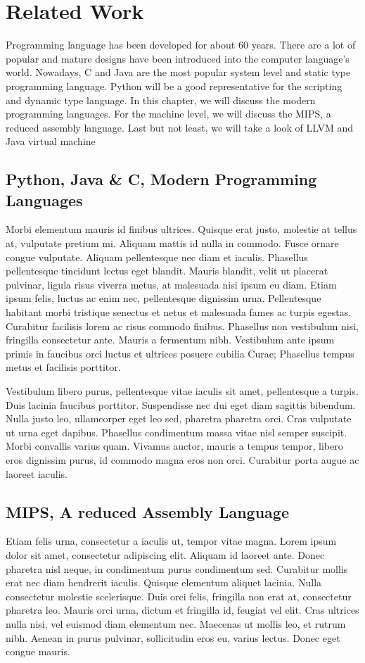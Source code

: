 \chapter{Related Work}
Programming language has been developed for about 60 years. There are a lot of popular and mature designs have been introduced into the computer language's world. Nowadays, C and Java are the most popular system level and static type programming language. Python will be a good representative for the scripting and dynamic type language. In this chapter, we will discuss the modern programming languages. For the machine level, we will discuss the MIPS, a reduced assembly language. Last but not least, we will take a look of LLVM and Java virtual machine

\section{Python, Java \& C, Modern Programming Languages}
Morbi elementum mauris id finibus ultrices. Quisque erat justo, molestie at tellus at, vulputate pretium mi. Aliquam mattis id nulla in commodo. Fusce ornare congue vulputate. Aliquam pellentesque nec diam et iaculis. Phasellus pellentesque tincidunt lectus eget blandit. Mauris blandit, velit ut placerat pulvinar, ligula risus viverra metus, at malesuada nisi ipsum eu diam. Etiam ipsum felis, luctus ac enim nec, pellentesque dignissim urna. Pellentesque habitant morbi tristique senectus et netus et malesuada fames ac turpis egestas. Curabitur facilisis lorem ac risus commodo finibus. Phasellus non vestibulum nisi, fringilla consectetur ante. Mauris a fermentum nibh. Vestibulum ante ipsum primis in faucibus orci luctus et ultrices posuere cubilia Curae; Phasellus tempus metus et facilisis porttitor.

Vestibulum libero purus, pellentesque vitae iaculis sit amet, pellentesque a turpis. Duis lacinia faucibus porttitor. Suspendisse nec dui eget diam sagittis bibendum. Nulla justo leo, ullamcorper eget leo sed, pharetra pharetra orci. Cras vulputate ut urna eget dapibus. Phasellus condimentum massa vitae nisl semper suscipit. Morbi convallis varius quam. Vivamus auctor, mauris a tempus tempor, libero eros dignissim purus, id commodo magna eros non orci. Curabitur porta augue ac laoreet iaculis.


\section{MIPS, A reduced Assembly Language}
Etiam felis urna, consectetur a iaculis ut, tempor vitae magna. Lorem ipsum dolor sit amet, consectetur adipiscing elit. Aliquam id laoreet ante. Donec pharetra nisl neque, in condimentum purus condimentum sed. Curabitur mollis erat nec diam hendrerit iaculis. Quisque elementum aliquet lacinia. Nulla consectetur molestie scelerisque. Duis orci felis, fringilla non erat at, consectetur pharetra leo. Mauris orci urna, dictum et fringilla id, feugiat vel elit. Cras ultrices nulla nisi, vel euismod diam elementum nec. Maecenas ut mollis leo, et rutrum nibh. Aenean in purus pulvinar, sollicitudin eros eu, varius lectus. Donec eget congue mauris.


